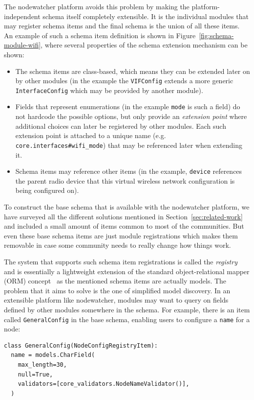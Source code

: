 \documentclass[5p,sort&compress]{elsarticle}
\begin{document}
The nodewatcher platform avoids this problem by making the platform-independent schema itself completely extensible.
It is the individual modules that may register schema items and the final schema is the union of all these items.
An example of such a schema item definition is shown in Figure~\ref{fig:schema-module-wifi}, where several properties of the schema extension mechanism can be shown:
\begin{itemize}
    \item The schema items are class-based, which means they can be extended later on by other modules (in the example the \texttt{VIFConfig} extends a more generic \texttt{InterfaceConfig} which may be provided by another module).
    \item Fields that represent enumerations (in the example \texttt{mode} is such a field) do not hardcode the possible options, but only provide an \textit{extension point} where additional choices can later be registered by other modules.
    Each such extension point is attached to a unique name (e.g. \texttt{core.interfaces\#wifi\_mode}) that may be referenced later when extending it.
    \item Schema items may reference other items (in the example, \texttt{device} references the parent radio device that this virtual wireless network configuration is being configured on).
\end{itemize}

To construct the base schema that is available with the nodewatcher platform, we have surveyed all the different solutions mentioned in Section~\ref{sec:related-work} and included a small amount of items common to most of the communities.
But even these base schema items are just module registrations which makes them removable in case some community needs to really change how things work.

The system that supports such schema item registrations is called the \textit{registry} and is essentially a lightweight extension of the standard object-relational mapper (ORM) concept~\cite{ONeil_2008} as the mentioned schema items are actually models.
The problem that it aims to solve is the one of simplified model discovery. In an extensible platform like nodewatcher, modules may want to query on fields defined by other modules somewhere in the schema. For example, there is an item called \texttt{GeneralConfig} in the base schema, enabling users to configure a \texttt{name} for a node:

\begin{verbatim}
class GeneralConfig(NodeConfigRegistryItem):
  name = models.CharField(
    max_length=30,
    null=True,
    validators=[core_validators.NodeNameValidator()],
  )
\end{verbatim}
\end{document}
